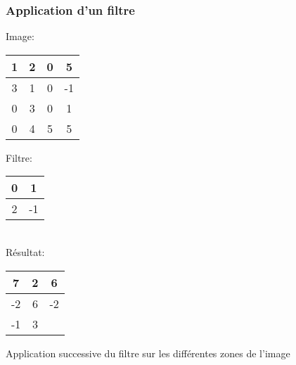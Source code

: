 \documentclass{formation}
\begin{document}
\begin{frame}
  \frametitle{Application d'un filtre}
  \begin{multicols}{2}
    Image:
    \begin{tabular}{|c|c|c|c|}
      \hline
      1 & 2 & 0 & 5 \\
      \hline
      3 & 1 & 0 & -1 \\
      \hline
      0 & \cellcolor{green}3 & \cellcolor{green}0 & 1 \\
      \hline
      0 & \cellcolor{green}4 & \cellcolor{green}5 & 5 \\
      \hline
    \end{tabular}

    \columnbreak

    Filtre:
    \begin{tabular}{|c|c|}
      \hline
      0 & 1  \\
      \hline
      2 & -1 \\
      \hline
    \end{tabular}\\[.5cm]
    Résultat:
    \begin{tabular}{|c|c|c|}
      \hline
      7 & 2 & 6\\
      \hline
      -2 & 6 & -2\\
      \hline
      -1 & 3 & \\
      \hline
    \end{tabular}
  \end{multicols}
  Application successive du filtre sur les différentes zones de l'image
\end{frame}
\end{document}
